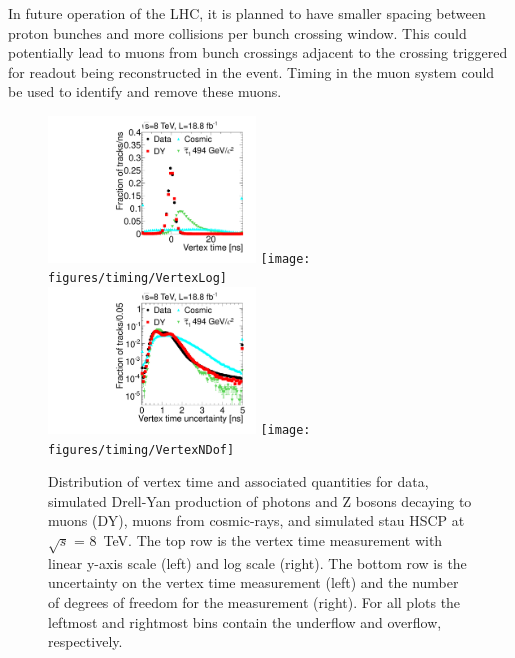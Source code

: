 In future operation of the LHC, it is planned to have smaller spacing between proton bunches and more collisions per bunch crossing window.
This could potentially lead to muons from bunch crossings adjacent to the crossing triggered for readout being reconstructed in the event.
Timing in the muon system could be used to identify and remove these muons.

\begin{figure}
  \begin{center}
      \includegraphics[width=0.49\textwidth]{figures/timing/Vertex}
      \texttt{[image: figures/timing/VertexLog]} \\
      \includegraphics[width=0.49\textwidth]{figures/timing/VertexErr}
      \texttt{[image: figures/timing/VertexNDof]} \\
      \caption[Distribution of vertex time and associated quantities.]
      {Distribution of vertex time and associated quantities for data,
simulated Drell-Yan production of photons and Z bosons decaying to muons (DY), muons from cosmic-rays, and simulated stau HSCP at $\sqrt{s}$ = 8~TeV.
The top row is the vertex time measurement with linear y-axis scale (left) and log scale (right).
The bottom row is the uncertainty on the vertex time measurement (left) and the number of degrees of freedom for the measurement (right).
For all plots the leftmost and rightmost bins contain the underflow and overflow, respectively.
        }
      \label{fig:vertextime}
  \end{center}
\end{figure}

